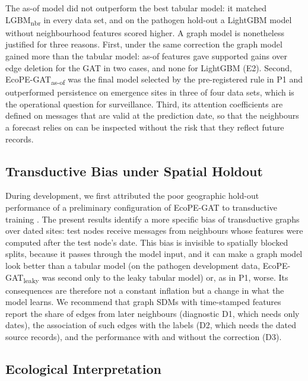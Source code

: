 \documentclass[a4paper,fleqn]{cas-sc}
\newcommand{\Masof}{\mbox{EcoPE-GAT\textsubscript{as-of}}}
\newcommand{\Mleaky}{\mbox{EcoPE-GAT\textsubscript{leaky}}}
\newcommand{\Lnbr}{\mbox{LGBM\textsubscript{nbr}}}
\begin{document}
The as-of model did not outperform the best tabular model: it matched \Lnbr{} in every data set, and on the pathogen hold-out a LightGBM model without neighbourhood features scored higher. A graph model is nonetheless justified for three reasons. First, under the same correction the graph model gained more than the tabular model: as-of features gave supported gains over edge deletion for the GAT in two cases, and none for LightGBM (E2). Second, \Masof{} was the final model selected by the pre-registered rule in P1 and outperformed persistence on emergence sites in three of four data sets, which is the operational question for surveillance. Third, its attention coefficients are defined on messages that are valid at the prediction date, so that the neighbours a forecast relies on can be inspected without the risk that they reflect future records.

\subsection{Transductive Bias under Spatial Holdout}

During development, we first attributed the poor geographic hold-out performance of a preliminary configuration of EcoPE-GAT to transductive training \citep{croft2023}. The present results identify a more specific bias of transductive graphs over dated sites: test nodes receive messages from neighbours whose features were computed after the test node's date. This bias is invisible to spatially blocked splits, because it passes through the model input, and it can make a graph model look better than a tabular model (on the pathogen development data, \Mleaky{} was second only to the leaky tabular model) or, as in P1, worse. Its consequences are therefore not a constant inflation but a change in what the model learns. We recommend that graph SDMs with time-stamped features report the share of edges from later neighbours (diagnostic D1, which needs only dates), the association of such edges with the labels (D2, which needs the dated source records), and the performance with and without the correction (D3).

\subsection{Ecological Interpretation}
\end{document}
